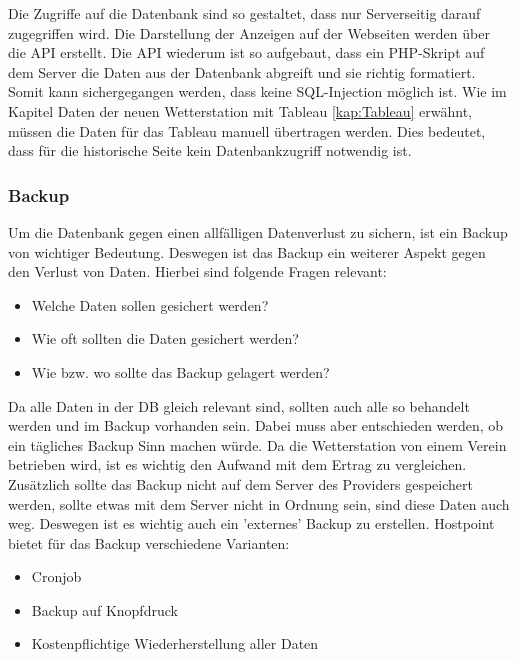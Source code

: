 Die Zugriffe auf die Datenbank sind so gestaltet, dass nur Serverseitig darauf zugegriffen wird. Die Darstellung der Anzeigen auf der Webseiten werden über die API erstellt. Die API wiederum ist so aufgebaut, dass ein PHP-Skript auf dem Server die Daten aus der Datenbank abgreift und sie richtig formatiert. Somit kann sichergegangen werden, dass keine SQL-Injection möglich ist. Wie im Kapitel Daten der neuen Wetterstation mit Tableau \ref{kap:Tableau} erwähnt, müssen die Daten für das Tableau manuell übertragen werden. Dies bedeutet, dass für die historische Seite kein Datenbankzugriff notwendig ist.

\subsubsection{Backup}
Um die Datenbank gegen einen allfälligen Datenverlust zu sichern, ist ein Backup von wichtiger Bedeutung. Deswegen ist das Backup ein weiterer Aspekt gegen den Verlust von Daten. Hierbei sind folgende Fragen relevant:
\begin{itemize}
\item Welche Daten sollen gesichert werden?
\item Wie oft sollten die Daten gesichert werden?
\item Wie bzw. wo sollte das Backup gelagert werden?
\end{itemize}

Da alle Daten in der DB gleich relevant sind, sollten auch alle so behandelt werden und im Backup vorhanden sein. Dabei muss aber entschieden werden, ob ein tägliches Backup Sinn machen würde. Da die Wetterstation von einem Verein betrieben wird, ist es wichtig den Aufwand mit dem Ertrag zu vergleichen. Zusätzlich sollte das Backup nicht auf dem Server des Providers gespeichert werden, sollte etwas mit dem Server nicht in Ordnung sein, sind diese Daten auch weg. Deswegen ist es wichtig auch ein 'externes' Backup zu erstellen. Hostpoint bietet für das Backup verschiedene Varianten:
\begin{itemize}
\item Cronjob
\item Backup auf Knopfdruck
\item Kostenpflichtige Wiederherstellung aller Daten
\end{itemize}


